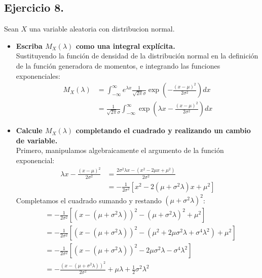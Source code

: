 \documentclass[10pt,a4paper]{book}
\begin{document}
\newpage

\subsection{Ejercicio 8.} Sean \(X\) una variable aleatoria con distribucion normal.


\vspace{0.2cm}

\begin{itemize}
    \item[\textbf{a)}] \textbf{Escriba $M_X(\lambda)$ como una integral explícita.} \\
    Sustituyendo la función de densidad de la distribución normal en la definición de la función generadora de momentos, e integrando las funciones exponenciales:
    \begin{align*}
        M_X(\lambda) &= \int_{-\infty}^{\infty} e^{\lambda x} \frac{1}{\sqrt{2\pi}\sigma} \exp\left(-\frac{(x-\mu)^2}{2\sigma^2}\right) dx \\
        &= \frac{1}{\sqrt{2\pi}\sigma} \int_{-\infty}^{\infty} \exp\left(\lambda x - \frac{(x-\mu)^2}{2\sigma^2}\right) dx
    \end{align*}

    \item[\textbf{b)}] \textbf{Calcule $M_X(\lambda)$ completando el cuadrado y realizando un cambio de variable.} \\
    Primero, manipulamos algebraicamente el argumento de la función exponencial:
    \begin{align*}
        \lambda x - \frac{(x-\mu)^2}{2\sigma^2} &= \frac{2\sigma^2\lambda x - (x^2 - 2\mu x + \mu^2)}{2\sigma^2} \\
        &= -\frac{1}{2\sigma^2} \left[ x^2 - 2(\mu + \sigma^2\lambda)x + \mu^2 \right]
    \end{align*}
    Completamos el cuadrado sumando y restando $(\mu + \sigma^2\lambda)^2$:
    \begin{align*}
        &= -\frac{1}{2\sigma^2} \left[ \left(x - (\mu + \sigma^2\lambda)\right)^2 - (\mu + \sigma^2\lambda)^2 + \mu^2 \right] \\
        &= -\frac{1}{2\sigma^2} \left[ \left(x - (\mu + \sigma^2\lambda)\right)^2 - (\mu^2 + 2\mu\sigma^2\lambda + \sigma^4\lambda^2) + \mu^2 \right] \\
        &= -\frac{1}{2\sigma^2} \left[ \left(x - (\mu + \sigma^2\lambda)\right)^2 - 2\mu\sigma^2\lambda - \sigma^4\lambda^2 \right] \\
        &= -\frac{\left(x - (\mu + \sigma^2\lambda)\right)^2}{2\sigma^2} + \mu\lambda + \frac{1}{2}\sigma^2\lambda^2
    \end{align*}


\end{itemize}
\end{document}
